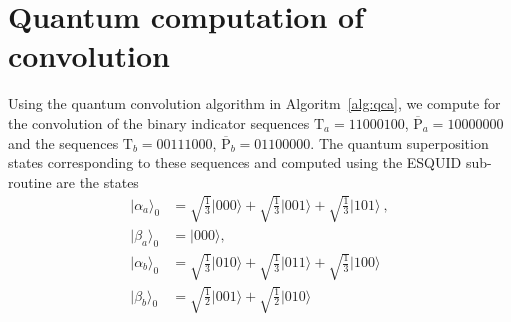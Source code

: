 \chapter{Quantum computation of convolution}\label{app:example-quantum-convolution}

Using the quantum convolution algorithm in Algoritm~\ref{alg:qca}, we compute for the convolution of the binary indicator sequences $\text{T}_a=11000100$, $\overline{\text{P}}_a=10000000$ and the sequences $\text{T}_b=00111000$, $\overline{\text{P}}_b=01100000$. The quantum superposition states corresponding to these sequences and computed using the ESQUID sub-routine are the states
\begin{align*}
	\vert \alpha_a \rangle_0 &= \sqrt{\frac{1}{3}}\vert 000 \rangle + \sqrt{\frac{1}{3}}\vert 001 \rangle + \sqrt{\frac{1}{3}}\vert 101 \rangle\ ,\\
	\vert \beta_a \rangle_0 &= \vert 000 \rangle,\\
	\vert \alpha_{b} \rangle_0 &= \sqrt{\frac{1}{3}}\vert 010 \rangle + \sqrt{\frac{1}{3}}\vert 011 \rangle + \sqrt{\frac{1}{3}}\vert 100 \rangle\\
	\vert \beta_{b} \rangle_0 &= \sqrt{\frac{1}{2}}\vert 001 \rangle + \sqrt{\frac{1}{2}}\vert 010 \rangle\
\end{align*}

